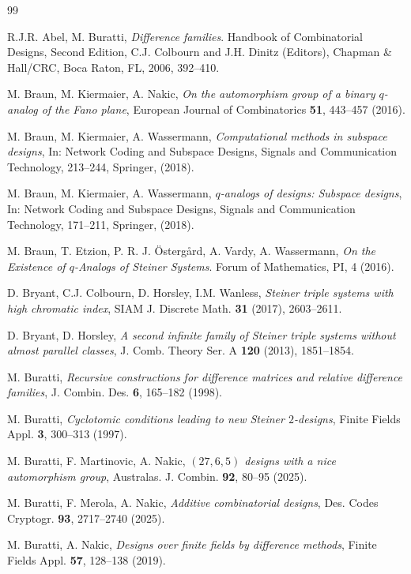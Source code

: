 \documentclass[a4paper, 11pt]{article}
\theoremstyle{definition}
\theoremstyle{definition}
\theoremstyle{definition}
\numberwithin{equation}{section}
\begin{document}
\begin{thebibliography}{99}

 R.J.R. Abel, M. Buratti, \emph{Difference families}.
Handbook of Combinatorial Designs,
Second Edition,  C.J. Colbourn and J.H. Dinitz (Editors), Chapman \&
Hall/CRC, Boca Raton, FL, 2006, 392--410.

 M. Braun, M. Kiermaier, A. Nakic, {\it On the automorphism group of a binary $q$-analog of the Fano plane}, 
European Journal of Combinatorics {\bf51}, 443--457 (2016).

M. Braun, M. Kiermaier, A. Wassermann, {\it Computational methods in subspace designs}, In: Network Coding and Subspace Designs, Signals and
Communication Technology, 213--244, Springer, (2018).

M. Braun, M. Kiermaier, A. Wassermann, {\it $q$-analogs of designs: Subspace designs}, In: Network Coding and Subspace Designs, Signals and
Communication Technology, 171--211, Springer, (2018).

M. Braun, T. Etzion, P. R. J. \"Osterg\aa rd, A. Vardy, A. Wassermann, {\it On the Existence of $q$-Analogs of Steiner Systems}. Forum of Mathematics, PI, 4 (2016).

D. Bryant, C.J. Colbourn, D. Horsley, I.M. Wanless,
{\it Steiner triple systems with high chromatic index},
SIAM J. Discrete Math. {\bf31} (2017), 2603--2611.

D. Bryant, D. Horsley,
{\it A second infinite family of Steiner triple systems without almost parallel classes},
J. Comb. Theory Ser. A {\bf120} (2013), 1851--1854.

M. Buratti,
{\it Recursive constructions for difference matrices 
and relative difference families}, 
J. Combin. Des. {\bf 6}, 165--182 (1998).

 M. Buratti,
{\it Cyclotomic conditions leading to new Steiner $2$-designs}, 
Finite Fields Appl. {\bf 3}, 300--313 (1997).

M. Buratti, F. Martinovic, A. Nakic, {\it $(27, 6, 5)$ designs with a nice automorphism group},
Australas. J. Combin. {\bf92}, 80--95 (2025).

M. Buratti, F. Merola, A. Nakic,
{\it Additive combinatorial designs}, Des. Codes Cryptogr. {\bf93}, 2717--2740 (2025).

 M. Buratti, A. Nakic, {\it Designs over finite fields by difference methods}, Finite Fields Appl. {\bf57}, 128--138 (2019).


\end{thebibliography}
\end{document}
